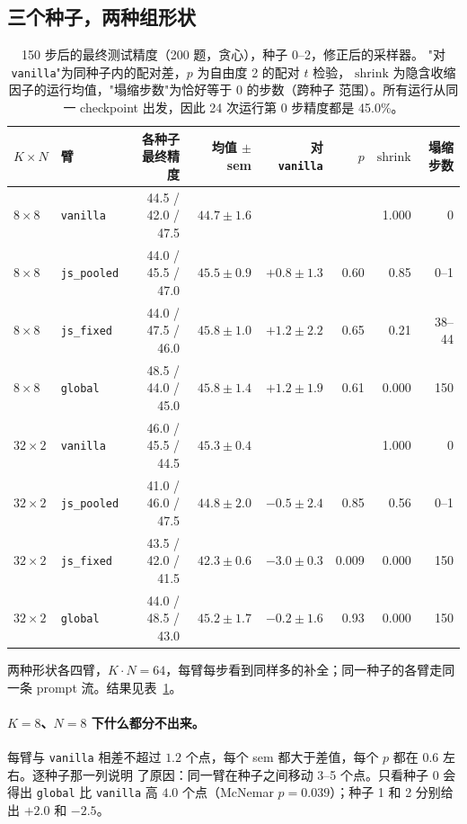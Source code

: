 \documentclass{article}
\newcommand{\shrink}{\mathrm{shrink}}
\newcommand{\arm}[1]{\texttt{#1}}
\begin{document}
\subsection{三个种子，两种组形状}
\label{sec:training}

\begin{table}[t]\centering\small\setlength{\tabcolsep}{4pt}
\begin{tabular}{llrrrrrr}
\toprule
$K{\times}N$ & 臂 & 各种子最终精度 & 均值 $\pm$ sem & 对 \arm{vanilla} & $p$ & $\shrink$ & 塌缩步数 \\
\midrule
$8{\times}8$  & \arm{vanilla}    & 44.5 / 42.0 / 47.5 & $44.7\pm1.6$ & & & 1.000 & 0 \\
$8{\times}8$  & \arm{js\_pooled} & 44.0 / 45.5 / 47.0 & $45.5\pm0.9$ & $+0.8\pm1.3$ & 0.60 & 0.85 & 0--1 \\
$8{\times}8$  & \arm{js\_fixed}  & 44.0 / 47.5 / 46.0 & $45.8\pm1.0$ & $+1.2\pm2.2$ & 0.65 & 0.21 & 38--44 \\
$8{\times}8$  & \arm{global}     & 48.5 / 44.0 / 45.0 & $45.8\pm1.4$ & $+1.2\pm1.9$ & 0.61 & 0.000 & 150 \\
\midrule
$32{\times}2$ & \arm{vanilla}    & 46.0 / 45.5 / 44.5 & $45.3\pm0.4$ & & & 1.000 & 0 \\
$32{\times}2$ & \arm{js\_pooled} & 41.0 / 46.0 / 47.5 & $44.8\pm2.0$ & $-0.5\pm2.4$ & 0.85 & 0.56 & 0--1 \\
$32{\times}2$ & \arm{js\_fixed}  & 43.5 / 42.0 / 41.5 & $42.3\pm0.6$ & $-3.0\pm0.3$ & 0.009 & 0.000 & 150 \\
$32{\times}2$ & \arm{global}     & 44.0 / 48.5 / 43.0 & $45.2\pm1.7$ & $-0.2\pm1.6$ & 0.93 & 0.000 & 150 \\
\bottomrule
\end{tabular}
\caption{150 步后的最终测试精度（200 题，贪心），种子 0--2，修正后的采样器。
"对 \arm{vanilla}"为同种子内的配对差，$p$ 为自由度 2 的配对 $t$ 检验，
$\shrink$ 为隐含收缩因子的运行均值，"塌缩步数"为恰好等于 $0$ 的步数（跨种子
范围）。所有运行从同一 checkpoint 出发，因此 24 次运行第 0 步精度都是 45.0\%。}
\label{tab:phase4b}
\end{table}

两种形状各四臂，$K\cdot N=64$，每臂每步看到同样多的补全；同一种子的各臂走同
一条 prompt 流。结果见表~\ref{tab:phase4b}。

\paragraph{$K=8$、$N=8$ 下什么都分不出来。} 每臂与 \arm{vanilla} 相差不超过
$1.2$ 个点，每个 sem 都大于差值，每个 $p$ 都在 $0.6$ 左右。逐种子那一列说明
了原因：同一臂在种子之间移动 3--5 个点。只看种子 0 会得出 \arm{global} 比
\arm{vanilla} 高 $4.0$ 个点（McNemar $p=0.039$）；种子 1 和 2 分别给出 $+2.0$
和 $-2.5$。
\end{document}
